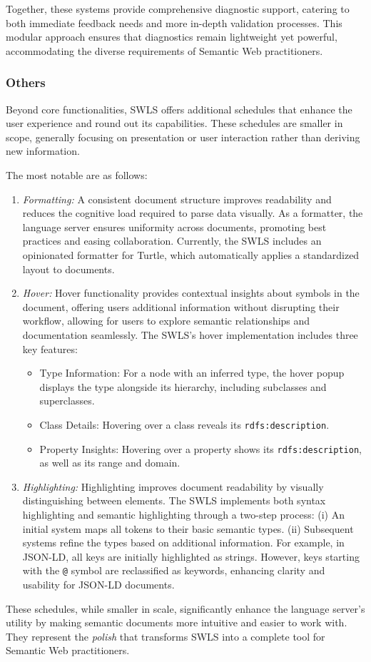 Together, these systems provide comprehensive diagnostic support, catering to both immediate feedback needs and more in-depth validation processes.
This modular approach ensures that diagnostics remain lightweight yet powerful, accommodating the diverse requirements of Semantic Web practitioners.

\subsubsection{Others}

Beyond core functionalities, SWLS offers additional schedules that enhance the user experience and round out its capabilities.
These schedules are smaller in scope, generally focusing on presentation or user interaction rather than deriving new information.

The most notable are as follows:
\begin{enumerate}
  \item \textit{Formatting:}
    A consistent document structure improves readability and reduces the cognitive load required to parse data visually.
    As a formatter, the language server ensures uniformity across documents, promoting best practices and easing collaboration.
    Currently, the SWLS includes an opinionated formatter for Turtle, which automatically applies a standardized layout to documents.

  \item \textit{Hover:}
    Hover functionality provides contextual insights about symbols in the document, offering users additional information without disrupting their workflow,
    allowing for users to explore semantic relationships and documentation seamlessly.
    The SWLS’s hover implementation includes three key features:
    \begin{itemize}
      \item Type Information: For a node with an inferred type, the hover popup displays the type alongside its hierarchy, including subclasses and superclasses.
      \item Class Details: Hovering over a class reveals its \texttt{rdfs:description}.
      \item Property Insights: Hovering over a property shows its \texttt{rdfs:description}, as well as its range and domain.
    \end{itemize}

  \item \textit{Highlighting:}
    Highlighting improves document readability by visually distinguishing between elements.
    The SWLS implements both syntax highlighting and semantic highlighting through a two-step process:
        (i) An initial system maps all tokens to their basic semantic types.
        (ii) Subsequent systems refine the types based on additional information.
    For example, in JSON-LD, all keys are initially highlighted as strings.
    However, keys starting with the \texttt{@} symbol are reclassified as keywords, enhancing clarity and usability for JSON-LD documents.
\end{enumerate}

These schedules, while smaller in scale, significantly enhance the language server’s utility by making semantic documents more intuitive and easier to work with.
They represent the \textit{polish} that transforms SWLS into a complete tool for Semantic Web practitioners.
